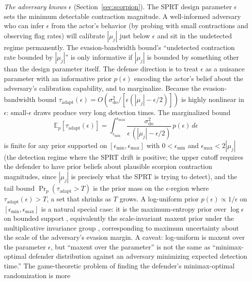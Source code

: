 \emph{The adversary knows $\epsilon$} (Section~\ref{sec:scorpion}).
The SPRT design parameter $\epsilon$ sets the minimum detectable
contraction magnitude. A well-informed adversary who can infer
$\epsilon$ from the actor's behavior (by probing with small
contractions and observing flag rates) will calibrate
$|\mu_j|$ just below $\epsilon$ and sit in the undetected regime
permanently. The evasion-bandwidth bound's ``undetected contraction
rate bounded by $|\mu_j|$'' is only informative if $|\mu_j|$ is
bounded by something other than the design parameter itself.
The defense direction is to treat $\epsilon$ as a nuisance
parameter with an informative prior $p(\epsilon)$ encoding the
actor's belief about the adversary's calibration capability, and
to marginalize. Because the evasion-bandwidth bound
$\tau_{\mathrm{adapt}}(\epsilon) =
O\!\left(\sigma_{\mathrm{do}}^2 /
[\epsilon(|\mu_j| - \epsilon/2)]\right)$
is highly nonlinear in $\epsilon$: small-$\epsilon$ draws produce
very long detection times. The marginalized bound
\begin{equation}
\label{eq:marginalized_evasion}
\mathbb{E}_{p}[\tau_{\mathrm{adapt}}(\epsilon)]
= \int_{\epsilon_{\min}}^{\epsilon_{\max}}
\frac{\sigma_{\mathrm{do}}^2}
     {\epsilon\,(|\mu_j| - \epsilon/2)}\,
p(\epsilon)\,d\epsilon
\end{equation}
is finite for any prior supported on
$[\epsilon_{\min}, \epsilon_{\max}]$ with
$0 < \epsilon_{\min}$ and $\epsilon_{\max} < 2|\mu_j|$
(the detection regime where the SPRT drift is positive; the
upper cutoff requires the defender to have prior beliefs about
plausible scorpion contraction magnitudes, since $|\mu_j|$ is
precisely what the SPRT is trying to detect),
and the tail bound
$\Pr_{p}(\tau_{\mathrm{adapt}} > T)$ is the prior mass on the
$\epsilon$-region where
$\tau_{\mathrm{adapt}}(\epsilon) > T$, a set that shrinks as
$T$ grows. A log-uniform prior
$p(\epsilon) \propto 1/\epsilon$ on
$[\epsilon_{\min}, \epsilon_{\max}]$ is a natural special case:
it is the maximum-entropy prior over $\log \epsilon$ on bounded
support \citep{jaynes1957information}, equivalently the
scale-invariant maxent prior under the multiplicative
invariance group \citep{jaynes1968prior}, corresponding to
maximum uncertainty about the scale of the adversary's evasion
margin. A caveat: log-uniform is maxent over the parameter
$\epsilon$, but ``maxent over the parameter'' is not the same as
``minimax-optimal defender distribution against an adversary
minimizing expected detection time.'' The game-theoretic problem
of finding the defender's minimax-optimal randomization is more
